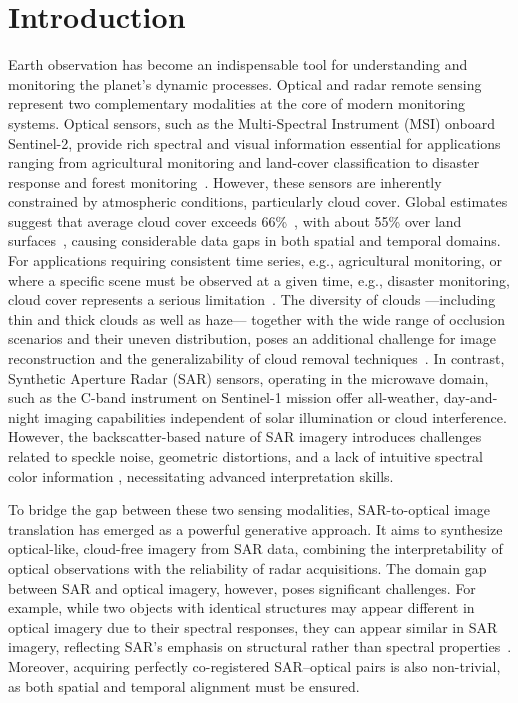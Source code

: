 \section{Introduction}
Earth observation has become an indispensable tool for understanding and monitoring the planet's dynamic processes. Optical and radar remote sensing represent two complementary modalities at the core of modern monitoring systems. Optical sensors, such as the Multi-Spectral Instrument (MSI) onboard Sentinel-2, provide rich spectral and visual information essential for applications ranging from agricultural monitoring and land-cover classification to disaster response and forest monitoring~\cite{S2MS_GAN}. However, these sensors are inherently constrained by atmospheric conditions, particularly cloud cover. Global estimates suggest that average cloud cover exceeds 66\%~\cite{dl_cloud_detection_survey,A_cGAN_fuse_sar_MS_CR,CR_SEN2_dRNN}, with about 55\% over land surfaces~\cite{CR_SEN2_dRNN}, causing considerable data gaps in both spatial and temporal domains. For applications requiring consistent time series, e.g., agricultural monitoring, or where a specific scene must be observed at a given time, e.g., disaster monitoring, cloud cover represents a serious limitation~\cite{CR_SEN2_dRNN}. The diversity of clouds —including thin and thick clouds as well as haze— together with the wide range of occlusion scenarios and their uneven distribution, poses an additional challenge for image reconstruction and the generalizability of cloud removal techniques~\cite{CR_Advances_Review_ORS}. In contrast, Synthetic Aperture Radar (SAR) sensors, operating in the microwave domain, such as the C-band instrument on Sentinel-1 mission offer all-weather, day-and-night imaging capabilities independent of solar illumination or cloud interference. However, the backscatter-based nature of SAR imagery introduces challenges related to speckle noise, geometric distortions, and a lack of intuitive spectral color information \cite{bench_sar_color, CR_RS_GAN_s2o}, necessitating advanced interpretation skills.

To bridge the gap between these two sensing modalities, SAR-to-optical image translation has emerged as a powerful generative approach. It aims to synthesize optical-like, cloud-free imagery from SAR data, combining the interpretability of optical observations with the reliability of radar acquisitions. The domain gap between SAR and optical imagery, however, poses significant challenges. For example, while two objects with identical structures may appear different in optical imagery due to their spectral responses, they can appear similar in SAR imagery, reflecting SAR’s emphasis on structural rather than spectral properties~\cite{RS_Data_Fusion_GANs_sota}. Moreover, acquiring perfectly co-registered SAR–optical pairs is also non-trivial, as both spatial and temporal alignment must be ensured. 

